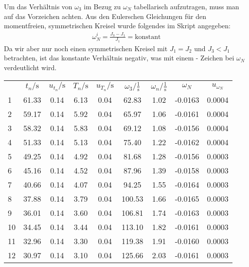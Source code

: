 Um das Verhältnis von $\omega_3$ im Bezug zu $\omega_N$ tabellarisch aufzutragen, muss man auf das Vorzeichen achten. Aus den Eulerschen Gleichungen für den momentfreien, symmetrischen Kreisel wurde folgendes im Skript angegeben:
\begin{align}
    \omega_N^i = \frac{J_3 - J_1}{J_1} = \text{konstant}
\end{align}
Da wir aber nur noch einen symmetrischen Kreisel mit $J_1 = J_2$ und $J_3<J_1$ betrachten, ist das konstante Verhältnis negativ, was mit einem - Zeichen bei $\omega_N$ verdeutlicht wird. 
\newpage
\begin{center}
    \begin{tabular}{gcccccccc}
         &     $t_n/\text{s}$ &   $u_{t_n}/\text{s}$ &     $T_n/\text{s}$ &   $u_{T_n}/\text{s}$ &      $\omega_3/\frac{1}{\text{s}}$ &    $\omega_n/\frac{1}{\text{s}}$ &      $\omega_N$ &    $u_{\omega_N}$ \\
        1  &  61.33 &  0.14 &  6.13 &  0.04 &   62.83 &  1.02 & -0.0163 &  0.0004 \\
        2  &  59.17 &  0.14 &  5.92 &  0.04 &   65.97 &  1.06 & -0.0161 &  0.0004 \\
        3  &  58.32 &  0.14 &  5.83 &  0.04 &   69.12 &  1.08 & -0.0156 &  0.0004 \\
        4  &  51.33 &  0.14 &  5.13 &  0.04 &   75.40 &  1.22 & -0.0162 &  0.0004 \\
        5  &  49.25 &  0.14 &  4.92 &  0.04 &   81.68 &  1.28 & -0.0156 &  0.0003 \\
        6  &  45.16 &  0.14 &  4.52 &  0.04 &   87.96 &  1.39 & -0.0158 &  0.0003 \\
        7  &  40.66 &  0.14 &  4.07 &  0.04 &   94.25 &  1.55 & -0.0164 &  0.0003 \\
        8  &  37.88 &  0.14 &  3.79 &  0.04 &  100.53 &  1.66 & -0.0165 &  0.0003 \\
        9  &  36.01 &  0.14 &  3.60 &  0.04 &  106.81 &  1.74 & -0.0163 &  0.0003 \\
        10 &  34.45 &  0.14 &  3.44 &  0.04 &  113.10 &  1.82 & -0.0161 &  0.0003 \\
        11 &  32.96 &  0.14 &  3.30 &  0.04 &  119.38 &  1.91 & -0.0160 &  0.0003 \\
        12 &  30.97 &  0.14 &  3.10 &  0.04 &  125.66 &  2.03 & -0.0161 &  0.0003 \\
    \end{tabular}
\end{center}
